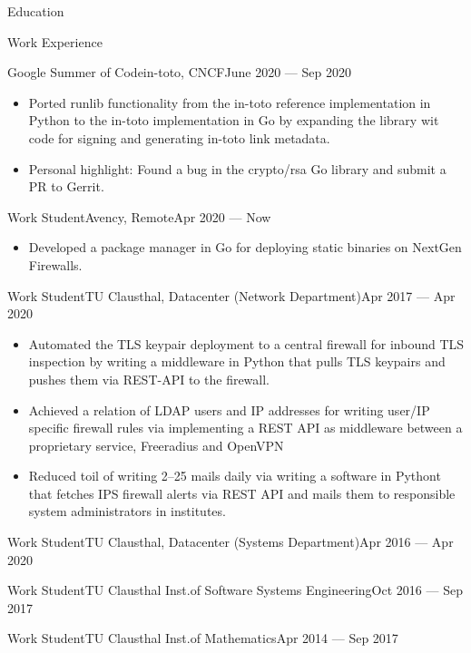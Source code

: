 \documentclass[]{mcdowellcv}
\begin{document}
\begin{cvsection}{Education}
\begin{cvsection}{Work Experience}
\begin{cvsubsection}{Google Summer of Code}{in-toto, CNCF}{June 2020 --- Sep 2020}
\begin{itemize}
\item Ported runlib functionality from the in-toto reference implementation in Python to the in-toto implementation in Go by expanding the library wit code for signing and generating in-toto link metadata.
\item Personal highlight: Found a bug in the crypto/rsa Go library and submit a PR to Gerrit.
\end{itemize}
\end{cvsubsection}
\begin{cvsubsection}{Work Student}{Avency, Remote}{Apr 2020 --- Now}
\begin{itemize}
\item Developed a package manager in Go for deploying static binaries on NextGen Firewalls.
\end{itemize}
\end{cvsubsection}
\begin{cvsubsection}{Work Student}{TU Clausthal, Datacenter (Network Department)}{Apr 2017 --- Apr 2020}
\bigskip
\begin{itemize}
\item Automated the TLS keypair deployment to a central firewall for inbound TLS inspection by writing a middleware in Python that pulls TLS keypairs and pushes them via REST-API to the firewall.
\item Achieved a relation of LDAP users and IP addresses for writing user/IP specific firewall rules via implementing
a REST API as middleware between a proprietary service, Freeradius and OpenVPN
\item Reduced toil of writing 2--25 mails daily via writing a software in Pythont that fetches IPS firewall alerts via REST API and mails them
to responsible system administrators in institutes.
\end{itemize}
\end{cvsubsection}
\begin{cvsubsection}{Work Student}{TU Clausthal, Datacenter (Systems Department)}{Apr 2016 --- Apr 2020}
\end{cvsubsection}
\begin{cvsubsection}{Work Student}{TU Clausthal Inst.\@ of Software Systems Engineering}{Oct 2016 --- Sep 2017}
\end{cvsubsection}
\begin{cvsubsection}{Work Student}{TU Clausthal Inst.\@ of Mathematics}{Apr 2014 --- Sep 2017}
\end{cvsubsection}
\end{cvsection}


\end{cvsection}
\end{document}
